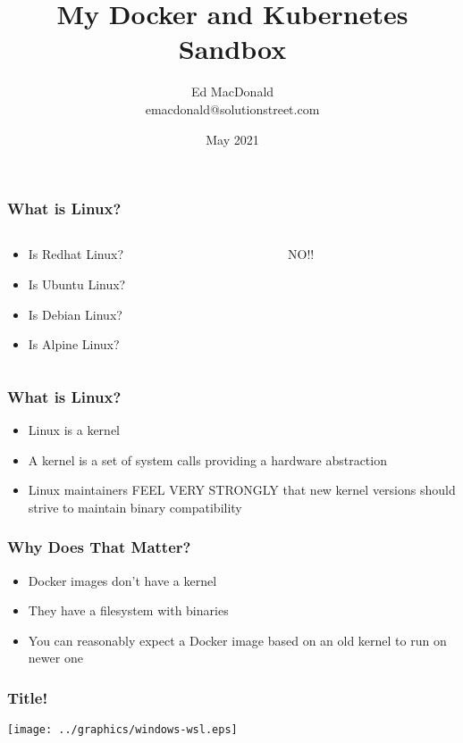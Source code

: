 \documentclass{beamer}
\title[Kubernetes]{My Docker and Kubernetes Sandbox}
\author[Ed MacDonald]{Ed MacDonald\\emacdonald@solutionstreet.com}
\date{May 2021}
\begin{document}
    \frame{\titlepage}

    \begin{frame}
    \frametitle{What is Linux?}
    \begin{columns}
        \begin{column}{0.5\textwidth}
            \begin{itemize}
                \item Is Redhat Linux?\pause
                \item Is Ubuntu Linux?\pause
                \item Is Debian Linux?\pause
                \item Is Alpine Linux?\pause
            \end{itemize}
        \end{column}
        \begin{column}{0.5\textwidth}
            NO!!
        \end{column}
    \end{columns}
    \end{frame}

    \begin{frame}
    \frametitle{What is Linux?}
    \begin{itemize}
        \item Linux is a kernel\pause
        \item A kernel is a set of system calls providing a hardware abstraction\pause
        \item Linux maintainers FEEL VERY STRONGLY that new kernel versions should strive to maintain binary compatibility
    \end{itemize}
    \end{frame}

    \begin{frame}
      \frametitle{Why Does That Matter?}
      \begin{itemize}
      \item Docker images don't have a kernel\pause
      \item They have a filesystem with binaries\pause
      \item You can reasonably expect a Docker image based on an old kernel to run on newer one
      \end{itemize}
    \end{frame}

    \begin{frame}
      \frametitle{Title!}
      \texttt{[image: ../graphics/windows-wsl.eps]}
    \end{frame}
\end{document}
